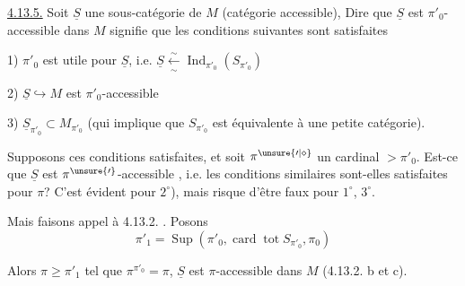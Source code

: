 
\uline{4.13.5.} Soit $\underline S$ une sous-catégorie 
de $M$ (catégorie accessible), 
Dire que $\underline S$ est $\pi'_0$-accessible dans $M$ signifie que
les conditions suivantes sont satisfaites

1) $\pi'_0$ est utile pour $\underline S$, i.e. $\underline S \overset{\sim}{\underset{\sim}{\leftarrow}}\operatorname{Ind}_{\pi'_0}(S_{\pi'_0})$\unsure{;}

2) $\underline S\hookrightarrow M$ est $\pi'_0$-accessible

3) $\underline S_{\pi'_0}\subset M_{\pi'_0}$ (qui implique que $S_{\pi'_0}$ est
équivalente à une petite catégorie).

 Supposons ces conditions satisfaites,
et soit $\pi^{\unsure{\prime|\diamond}}$ un cardinal $>\pi'_0$. Est-ce que
$\underline S$ est $\pi^{\unsure{\prime}}$-accessible , i.e. les conditions
similaires sont-elles satisfaites pour $\pi$?
C'est évident pour $2^\circ$), mais risque d'être
faux pour $1^\circ$, $3^\circ$.

 Mais faisons appel à
4.13.2. .  Posons
\[
\pi'_1=\operatorname{Sup}(\pi'_0,\operatorname{card}\operatorname{tot} S_{\pi'_0},\pi_0)
\]

Alors  $\pi\geq\pi'_1$ tel que $\pi^{\pi'_0}=\pi$,
$\underline S$ est $\pi$-accessible dans $M$ (4.13.2. b et c).

